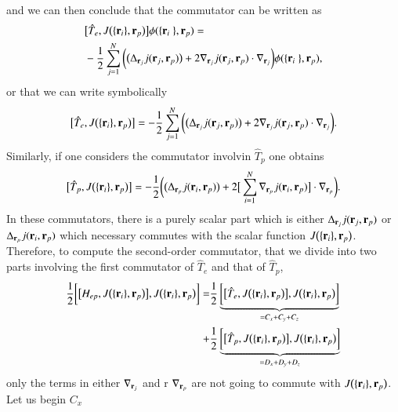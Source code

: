 \documentclass[aip,jcp,reprint,noshowkeys,superscriptaddress]{revtex4-1}
\newcommand{\bri}[1]{{\bf r}_{#1}}
\newcommand{\Hep}[0]{H_{ep}}
\begin{document}
and we can then conclude that the commutator can be written as 
\begin{equation}
 \begin{aligned}
 & \big[\hat{T}_e,J\big(\{\bri{i} \},\bri{p}\big)\big] \phi(\{ \bri{i} \},\bri{p}) =  \\ & -\frac{1}{2}
 \sum_{j=1}^N \bigg(\big(\Delta_{\bri{j}} j(\bri{j},\bri{p})\big)+ 2 \nabla_{\bri{j}} j(\bri{j},\bri{p}) \cdot \nabla_{\bri{j}} \bigg) \phi(\{ \bri{i} \},\bri{p}),
 \end{aligned}
\end{equation}
or that we can write symbolically 
\begin{equation}
 \big[\hat{T}_e,J\big(\{\bri{i} \},\bri{p}\big)\big] = -\frac{1}{2}
 \sum_{j=1}^N \bigg(\big(\Delta_{\bri{j}} j(\bri{j},\bri{p})\big)+ 2 \nabla_{\bri{j}} j(\bri{j},\bri{p}) \cdot \nabla_{\bri{j}} \bigg).
\end{equation}
Similarly, if one considers the commutator involvin $\hat{T}_p$ one obtains 
\begin{equation}
 \big[\hat{T}_p,J\big(\{\bri{i} \},\bri{p}\big)\big] = -\frac{1}{2} \bigg(\big(\Delta_{\bri{p}} j(\bri{i},\bri{p})\big)+ 2 \big[\sum_{i=1}^N \nabla_{\bri{p}} j(\bri{i},\bri{p})\big] \cdot \nabla_{\bri{p}} \bigg).
\end{equation}
In these commutators, there is a purely scalar part which is either $\Delta_{\bri{j}} j(\bri{j},\bri{p})$ or $\Delta_{\bri{p}} j(\bri{i},\bri{p})$ which necessary commutes with the scalar function $J\big(\{\bri{i} \},\bri{p}\big)$. 
Therefore, to compute the second-order commutator, that we divide into two parts involving the first commutator of $\hat{T}_e$ and that of $\hat{T}_p$, 
\begin{equation}
 \begin{aligned}
  \frac{1}{2}        \bigg[\big[\Hep,J\big(\{\bri{i} \},\bri{p}\big)\big], J\big(\{\bri{i} \},\bri{p}\big) \bigg]  = &
 \frac{1}{2}\underbrace{\bigg[\big[\hat{T}_e,J\big(\{\bri{i} \},\bri{p}\big)\big], J\big(\{\bri{i} \},\bri{p}\big) \bigg]}_{=C_x + C_y + C_z } \\
 +&   
 \frac{1}{2}\underbrace{\bigg[\big[\hat{T}_p,J\big(\{\bri{i} \},\bri{p}\big)\big], J\big(\{\bri{i} \},\bri{p}\big) \bigg]}_{=D_x + D_y + D_z} \\
 \end{aligned}
\end{equation}only the terms in either $\nabla_{\bri{j}}$ and r $\nabla_{\bri{p}}$ are not going to commute with $J\big(\{\bri{i} \},\bri{p}\big)$. 
Let us begin $C_x$
\end{document}
